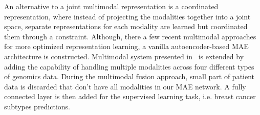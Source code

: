 \hspace*{3.5mm} An alternative to a joint multimodal representation is a coordinated representation, where instead of projecting the modalities together into a joint space, separate representations for each modality are learned but coordinated them through a constraint. Although, there a few recent multimodal approaches for more optimized representation learning, a vanilla autoencoder-based MAE architecture is constructed. Multimodal system presented in~\cite{wang2018associativemulti} is extended by adding the capability of handling multiple modalities across four different types of genomics data. During the multimodal fusion approach, small part of patient data is discarded that don't have all modalities in our MAE network. A fully connected layer is then added for the supervised learning task, i.e. breast cancer subtypes predictions. 


